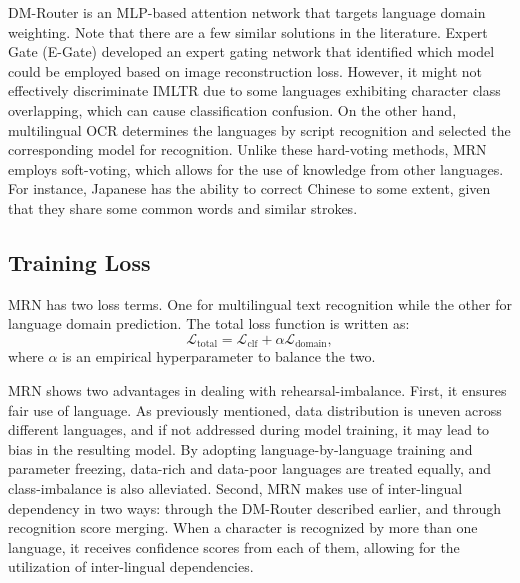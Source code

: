 \documentclass[10pt,twocolumn,letterpaper]{article}
\begin{document}
DM-Router is an MLP-based attention network that targets language domain weighting. Note that there are a few similar solutions in the literature. Expert Gate (E-Gate) \cite{Aljundi2017expert_gate} developed an expert gating network that identified which model could be employed based on image reconstruction loss. However, it might not effectively discriminate IMLTR due to some languages exhibiting character class overlapping, which can cause classification confusion. On the other hand, multilingual OCR \cite{huang2021multiocr} determines the languages by script recognition and selected the corresponding model for recognition. Unlike these hard-voting methods, MRN employs soft-voting, which allows for the use of knowledge from other languages. For instance, Japanese has the ability to correct Chinese to some extent, given that they share some common words and similar strokes.

\subsection{Training Loss}
MRN has two loss terms. One for multilingual text recognition while the other for language domain prediction. The total loss function is written as:
\begin{equation}
\mathcal{L}_{\mathrm{total}}= \mathcal{L}_{\mathrm{clf}}+\alpha \mathcal{L}_{\mathrm{domain}},
\label{e5}
\end{equation}
where $\alpha$ is an empirical hyperparameter to balance the two.


MRN shows two advantages in dealing with rehearsal-imbalance. First, it ensures fair use of language. As previously mentioned, data distribution is uneven across different languages, and if not addressed during model training, it may lead to bias in the resulting model. By adopting language-by-language training and parameter freezing, data-rich and data-poor languages are treated equally, and class-imbalance is also alleviated. Second, MRN makes use of inter-lingual dependency in two ways: through the DM-Router described earlier, and through recognition score merging. When a character is recognized by more than one language, it receives confidence scores from each of them, allowing for the utilization of inter-lingual dependencies. 
\end{document}
